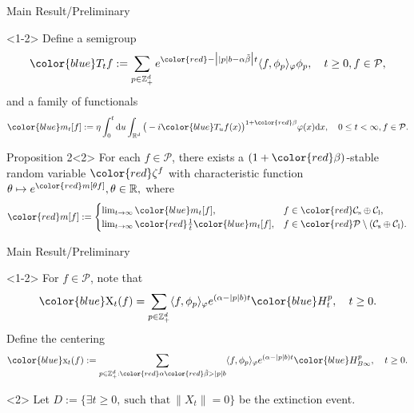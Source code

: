 \documentclass[xcolor=dvipsnames]{beamer}
\begin{document}
\begin{frame}{Main Result/Preliminary}

\begin{block}{}<1-2>
Define a semigroup
\begin{align*}
{\color{blue}T_t} f
:= \sum_{p \in \mathbb Z_+^d} e^{\color{red}-\big| |p|b - \alpha \tilde \beta \big|t} \langle f, \phi_p \rangle_{\varphi} \phi_p
,\quad t\geq 0, f\in \mathcal P,
\end{align*}
and a family of functionals
$$
{\color{blue}m_t}[f]
:= \eta \int_0^t \mathrm du \int_{\mathbb R^d} \big(-i {\color{blue}T_u} f(x)\big)^{1+{\color{red}\beta}} \varphi(x) \mathrm dx
, \quad 0 \leq t< \infty, f\in \mathcal P.
$$
\end{block}

\begin{block}{Proposition 2}<2>   
For each $f\in \mathcal P$, there exists a $(1+{\color{red}\beta})$-stable random variable ${\color{red}\zeta^f}$ with characteristic function
$
\theta \mapsto e^{\color{red}m[\theta f]}, \theta \in \mathbb R,
$
where
$$
{\color{red}m[f]}
:= \begin{cases}
\lim_{t\to \infty} {\color{blue}m_t}[f], &
f \in {\color{red}\mathcal C_\mathrm s \oplus \mathcal C_\mathrm l}, \\
\lim_{t\to \infty} {\color{red}\frac{1}{t}} {\color{blue}m_t}[f], & f\in {\color{red}\mathcal P \setminus (\mathcal C_\mathrm s \oplus \mathcal C_\mathrm l)}.
\end{cases}
$$
\end{block}
\end{frame}

\begin{frame}{Main Result/Preliminary}

\begin{block}{}<1-2>
For $f\in \mathcal P$, note that
	$$
	{\color{blue}\mathrm X_t(f)} = \sum_{p\in \mathbb Z^d_+}\langle f,\phi_p\rangle_\varphi e^{(\alpha-|p|b)t}{\color{blue}H^p_{t}}, \quad t\ge 0.
	$$ 
Define the centering 
$$
{\color{blue}\mathrm x_t(f)} : = \sum_{p\in \mathbb Z^d_+:{\color{red}\alpha} {\color{red}\tilde \beta>|p|b}}\langle f,\phi_p\rangle_\varphi e^{(\alpha-|p|b)t}{\color{blue}H^p_{B\infty}}, \quad t\ge 0.
$$ 
\end{block}
\begin{block}{}<2>
	Let $D :=\{\exists t\geq 0,~\text{such that}~ \|X_t\| =0 \}$
	be the extinction event. 
\end{block}
\end{frame}
\end{document}
